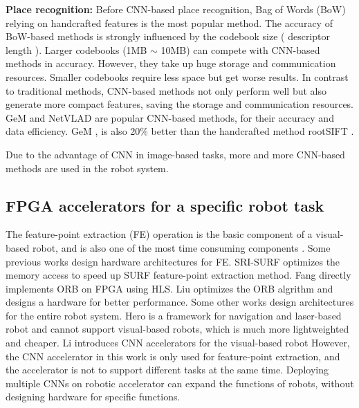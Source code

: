 \textbf{Place recognition:} Before CNN-based place recognition, Bag of Words (BoW) \cite{small_1} relying on handcrafted features is the most popular method. The accuracy of BoW-based methods is strongly influenced by the codebook size ( descriptor length ). Larger codebooks (1MB $\sim$ 10MB) \cite{large_1, large_2} can compete with CNN-based methods in accuracy. However, they take up huge storage and communication resources. Smaller codebooks\cite{small_1, small_2, jegou2014triang} require less space but get worse results. In contrast to traditional methods, CNN-based methods not only perform well but also generate more compact features, saving the storage and communication resources. GeM \cite{radenovic2018fine} and NetVLAD \cite{arandjelovic2016netvlad} are popular CNN-based methods, for their accuracy and data efficiency. GeM \cite{radenovic2018fine}, is also 20\% better than the handcrafted method rootSIFT \cite{jegou2014triang}.

Due to the advantage of CNN in image-based tasks, more and more CNN-based methods are used in the robot system.


\subsection{ FPGA accelerators for a specific robot task }

The feature-point extraction (FE) operation is the basic component of a visual-based robot, and is also one of the most time consuming components \cite{fang2017fpga}.
Some previous works design hardware architectures for FE.
SRI-SURF \cite{jia2016sri} optimizes the memory access to speed up SURF \cite{bay2006surf} feature-point extraction method. 
Fang \cite{fang2017fpga} directly implements ORB on FPGA using HLS. Liu \cite{liu2019eslam} optimizes the ORB algrithm and designs a hardware for better performance.
Some other works design architectures for the entire robot system. Hero \cite{shi2018hero} is a framework for navigation and laser-based robot and cannot support visual-based robots, which is much more lightweighted and cheaper. 
Li \cite{li2019879gops} introduces CNN accelerators for the visual-based robot
However, the CNN accelerator in this work\cite{li2019879gops} is only used for feature-point extraction, and the accelerator is not to support different tasks at the same time. 
Deploying multiple CNNs on robotic accelerator can expand the functions of robots, without designing hardware for specific functions.



